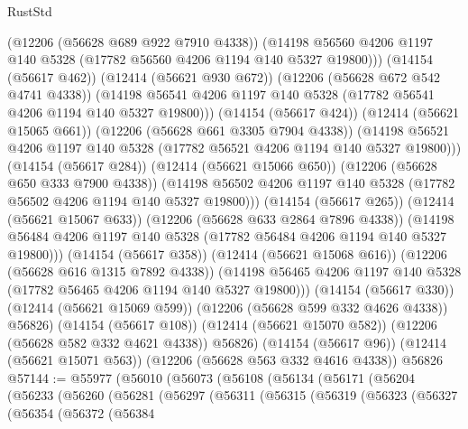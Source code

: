 \begin{lexlean}{RustStd}
\begin{coremodule}
{\begin{coremodule}
{{{{{{{{{{{{{{{{{{{{{{{{{{{{{{{{{{{{{{{{{{{{{{{{{{                    (@12206 (@56628 @689 @922 @7910 @4338))
                    (@14198
                      @56560
                      @4206
                      @1197
                      @140
                      @5328
                      (@17782 @56560 @4206 @1194 @140 @5327 @19800)))
                  (@14154 (@56617 @462))
                  (@12414 (@56621 @930 @672))
                  (@12206 (@56628 @672 @542 @4741 @4338))
                  (@14198
                    @56541
                    @4206
                    @1197
                    @140
                    @5328
                    (@17782 @56541 @4206 @1194 @140 @5327 @19800)))
                (@14154 (@56617 @424))
                (@12414 (@56621 @15065 @661))
                (@12206 (@56628 @661 @3305 @7904 @4338))
                (@14198
                  @56521
                  @4206
                  @1197
                  @140
                  @5328
                  (@17782 @56521 @4206 @1194 @140 @5327 @19800)))
              (@14154 (@56617 @284))
              (@12414 (@56621 @15066 @650))
              (@12206 (@56628 @650 @333 @7900 @4338))
              (@14198 @56502 @4206 @1197 @140 @5328 (@17782 @56502 @4206 @1194 @140 @5327 @19800)))
            (@14154 (@56617 @265))
            (@12414 (@56621 @15067 @633))
            (@12206 (@56628 @633 @2864 @7896 @4338))
            (@14198 @56484 @4206 @1197 @140 @5328 (@17782 @56484 @4206 @1194 @140 @5327 @19800)))
          (@14154 (@56617 @358))
          (@12414 (@56621 @15068 @616))
          (@12206 (@56628 @616 @1315 @7892 @4338))
          (@14198 @56465 @4206 @1197 @140 @5328 (@17782 @56465 @4206 @1194 @140 @5327 @19800)))
        (@14154 (@56617 @330))
        (@12414 (@56621 @15069 @599))
        (@12206 (@56628 @599 @332 @4626 @4338))
        @56826)
      (@14154 (@56617 @108))
      (@12414 (@56621 @15070 @582))
      (@12206 (@56628 @582 @332 @4621 @4338))
      @56826)
    (@14154 (@56617 @96))
    (@12414 (@56621 @15071 @563))
    (@12206 (@56628 @563 @332 @4616 @4338))
    @56826
@57144 := @55977
    (@56010
      (@56073
        (@56108
          (@56134
            (@56171
              (@56204
                (@56233
                  (@56260
                    (@56281
                      (@56297
                        (@56311
                          (@56315
                            (@56319
                              (@56323
                                (@56327
                                  (@56354
                                    (@56372
                                      (@56384
}}}}}}}}}}}}}}}}}}}}}}}}}}}}}}}}}}}}}}}}}}}}}}}}}}
\end{coremodule}}
\end{coremodule}
\end{lexlean}
